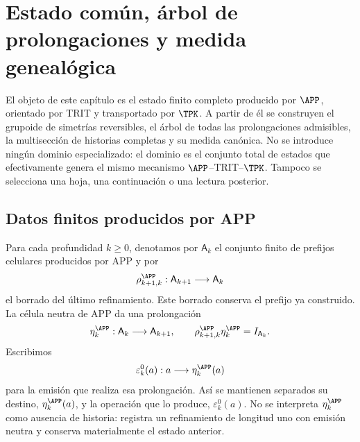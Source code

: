 \chapter{Estado común, árbol de prolongaciones y medida genealógica}
\label{chap:continuo-estado-arbol-medida-comun}

\begin{thesisbox}[title={Un solo estado enriquecido antes de toda discriminación interna}]
El objeto de este capítulo es el estado finito completo producido por
\(\APP\), orientado por TRIT y transportado por \(\TPK\).  A partir de él se
construyen el grupoide de simetrías reversibles, el árbol de todas las
prolongaciones admisibles, la multisección de historias completas y su medida
canónica.  No se introduce ningún dominio especializado: el dominio es el
conjunto total de estados que efectivamente genera el mismo mecanismo
\(\APP\)--TRIT--\(\TPK\).  Tampoco se selecciona una hoja, una continuación o
una lectura posterior.
\end{thesisbox}

\section{Datos finitos producidos por APP}
\label{sec:continuo-comun-app-finito}

Para cada profundidad \(k\geq0\), denotamos por \(\mathsf A_k\) el conjunto
finito de prefijos celulares producidos por APP y por
\begin{equation}
\label{eq:continuo-comun-app-truncamiento}
 \rho^{\APP}_{k+1,k}:\mathsf A_{k+1}\longrightarrow\mathsf A_k
\end{equation}
el borrado del último refinamiento.  Este borrado conserva el prefijo ya
construido.  La célula neutra de APP da una prolongación
\begin{equation}
\label{eq:continuo-comun-app-degeneracion}
 \eta^{\APP}_k:\mathsf A_k\longrightarrow\mathsf A_{k+1},
 \qquad
 \rho^{\APP}_{k+1,k}\eta^{\APP}_k=I_{\mathsf A_k}.
\end{equation}
Escribimos
\begin{equation}
\label{eq:continuo-comun-emision-neutra-app}
 \varepsilon^0_k(a):a\longrightarrow\eta^{\APP}_k(a)
\end{equation}
para la emisión que realiza esa prolongación.  Así se mantienen separados su
destino, \(\eta^{\APP}_k(a)\), y la operación que lo produce,
\(\varepsilon^0_k(a)\).
No se interpreta \(\eta^{\APP}_k\) como ausencia de historia: registra un
refinamiento de longitud uno con emisión neutra y conserva materialmente el
estado anterior.

